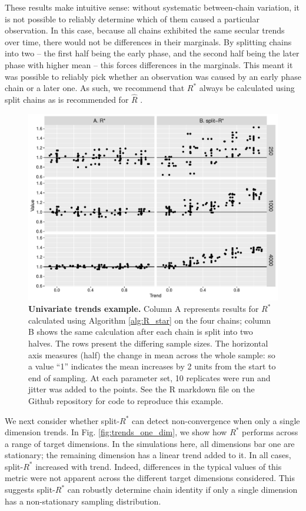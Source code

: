 \documentclass{article}
\begin{document}
These results make intuitive sense: without systematic between-chain variation, it is not possible to reliably determine which of them caused a particular observation. In this case, because all chains exhibited the same secular trends over time, there would not be differences in their marginals. By splitting chains into two -- the first half being the early phase, and the second half being the later phase with higher mean -- this forces differences in the marginals. This meant it was possible to reliably pick whether an observation was caused by an early phase chain or a later one. As such, we recommend that $R^*$ always be calculated using split chains as is recommended for $\widehat{R}$ \citep{carpenter2017stan,vehtari2019rank}.

\begin{figure}[!htb]
	\centerline{\includegraphics[width=1.0\textwidth]{../output/trends_all_dim.pdf}}
	\caption{\textbf{Univariate trends example.} Column A represents results for $R^*$ calculated using Algorithm \ref{alg:R_star} on the four chains; column B  shows the same calculation after each chain is split into two halves. The rows present the differing sample sizes. The horizontal axis measures (half) the change in mean across the whole sample: so a value ``1'' indicates the mean increases by 2 units from the start to end of sampling. At each parameter set, 10 replicates were run and jitter was added to the points. See the R markdown file on the Github repository for code to reproduce this example.}
	\label{fig:trends_all_dim}
\end{figure}

We next consider whether split-$R^*$ can detect non-convergence when only a single dimension trends. In Fig. \ref{fig:trends_one_dim}, we show how $R^*$ performs across a range of target dimensions. In the simulations here, all dimensions bar one are stationary; the remaining dimension has a linear trend added to it. In all cases, split-$R^*$ increased with trend. Indeed, differences in the typical values of this metric were not apparent across the different target dimensions considered. This suggests split-$R^*$ can robustly determine chain identity if only a single dimension has a non-stationary sampling distribution.
\end{document}
